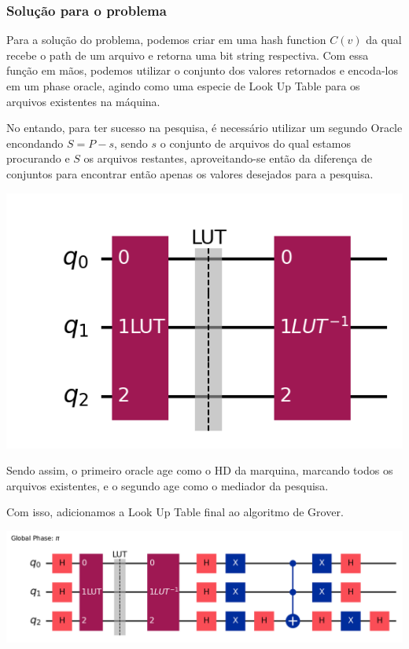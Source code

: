 \documentclass{article}
\begin{document}
\subsubsection{Solução para o problema}

Para a solução do problema, podemos criar em uma hash function $C(v)$ da qual recebe o path de um arquivo e retorna uma bit string respectiva. Com essa função em mãos, podemos utilizar o conjunto dos valores retornados e encoda-los em um phase oracle, agindo como uma especie de Look Up Table para os arquivos existentes na máquina.

No entando, para ter sucesso na pesquisa, é necessário utilizar um segundo Oracle encondando $S = P-s$, sendo $s$ o conjunto de arquivos do qual estamos procurando e $S$ os arquivos restantes, aproveitando-se então da diferença de conjuntos para encontrar então apenas os valores desejados para a pesquisa.


\begin{center}
	\includegraphics[scale=0.6]{sets-difference-look-up-table-oracle.png}
	\label{fig:luts}
\end{center}

Sendo assim, o primeiro oracle age como o HD da marquina, marcando todos os arquivos existentes, e o segundo age como o mediador da pesquisa.

Com isso, adicionamos a Look Up Table final ao algoritmo de Grover.

\begin{center}
	\includegraphics[scale=0.5]{file_explorer.png}
	\label{fig:file-explorer}
\end{center}
\end{document}
